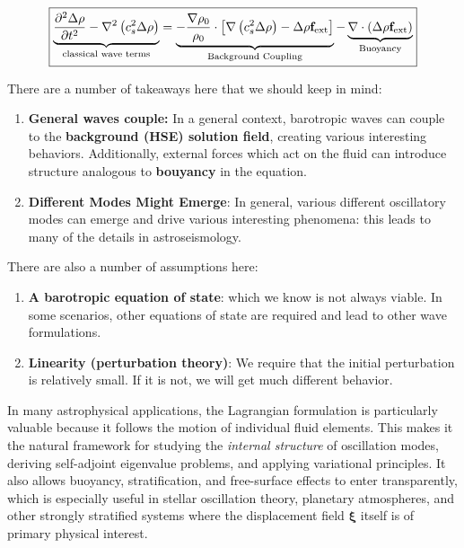 \begin{equation}
    \label{eq:lagrangian_wave_equation}
    \boxed{
    \underbrace{\frac{\partial^2 \Delta \rho}{\partial t^2} - \nabla^2 \left(c_s^2\Delta \rho\right)}_{\text{classical wave terms}} = \underbrace{- \frac{\nabla \rho_0}{\rho_0} \cdot  \left[\nabla \left(c_s^2 \Delta \rho\right) - \Delta \rho {\bf f}_{\rm ext} \right]}_{\text{Background Coupling}}- \underbrace{\nabla \cdot \left(\Delta \rho {\bf f}_{\rm ext}\right)}_{\text{Buoyancy}}
    }
\end{equation}
\begin{remark}
    There are a number of takeaways here that we should keep in mind:
    
    \begin{enumerate}
        \item \textbf{General waves couple:} In a general context, barotropic waves can couple to the \textbf{background (HSE) solution field}, creating various interesting behaviors. Additionally, external forces which act on the fluid can introduce structure analogous to \textbf{bouyancy} in the equation.
        \item \textbf{Different Modes Might Emerge}: In general, various different oscillatory modes can emerge and drive various interesting phenomena: this leads to many of the details in astroseismology.
    \end{enumerate}

There are also a number of assumptions here:

\begin{enumerate}
\item \textbf{A barotropic equation of state}: which we know is not always viable. In some scenarios, other equations of state are required and lead to other wave formulations.
\item \textbf{Linearity (perturbation theory)}: We require that the initial perturbation is relatively small. If it is not, we will get much different behavior.
\end{enumerate}
\end{remark}

In many astrophysical applications, the Lagrangian formulation is particularly valuable because it follows the motion of individual fluid elements. This makes it the natural framework for studying the \emph{internal structure} of oscillation modes, deriving self-adjoint eigenvalue problems, and applying variational principles. It also allows buoyancy, stratification, and free-surface effects to enter transparently, which is especially useful in stellar oscillation theory, planetary atmospheres, and other strongly stratified systems where the displacement field $\boldsymbol{\xi}$ itself is of primary physical interest.

